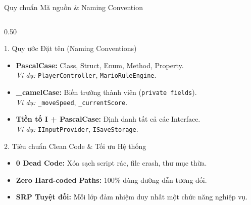 \documentclass[aspectratio=169, 10pt]{beamer}
\begin{document}
\begin{frame}{Quy chuẩn Mã nguồn \& Naming Convention}
    \begin{columns}[T]
        \begin{column}{0.50\textwidth}
            \begin{infoCard}[top=2pt, bottom=2pt]{1. Quy ước Đặt tên (Naming Conventions)}
                \begin{itemize}\scriptsize\setlength{\itemsep}{0.8pt}
                    \item \textbf{PascalCase:} Class, Struct, Enum, Method, Property. \\
                    \textit{Ví dụ:} \texttt{PlayerController}, \texttt{MarioRuleEngine}.
                    \item \textbf{\_camelCase:} Biến trường thành viên (\texttt{private fields}). \\
                    \textit{Ví dụ:} \texttt{\_moveSpeed}, \texttt{\_currentScore}.
                    \item \textbf{Tiền tố I + PascalCase:} Định danh tất cả các Interface. \\
                    \textit{Ví dụ:} \texttt{IInputProvider}, \texttt{ISaveStorage}.
                \end{itemize}
            \end{infoCard}

            \begin{successCard}[top=2pt, bottom=2pt]{2. Tiêu chuẩn Clean Code \& Tối ưu Hệ thống}
                \begin{itemize}\scriptsize\setlength{\itemsep}{0.8pt}
                    \item \textbf{0 Dead Code:} Xóa sạch script rác, file crash, thư mục thừa.
                    \item \textbf{Zero Hard-coded Paths:} 100\% dùng đường dẫn tương đối.
                    \item \textbf{SRP Tuyệt đối:} Mỗi lớp đảm nhiệm duy nhất một chức năng nghiệp vụ.
                \end{itemize}
            \end{successCard}
        \end{column}


\end{columns}
\end{frame}
\end{document}
